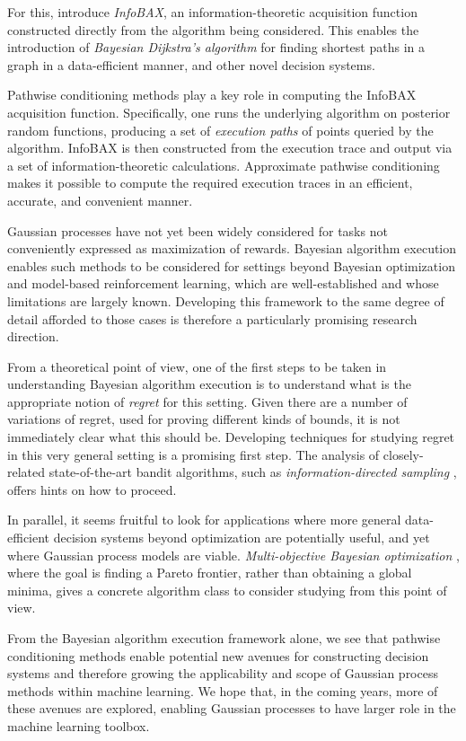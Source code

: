 \documentclass[11pt]{book}
\begin{document}
For this, \textcite{neiswanger21} introduce \emph{InfoBAX}, an information-theoretic acquisition function constructed directly from the algorithm being considered.
This enables the introduction of \emph{Bayesian Dijkstra's algorithm} for finding shortest paths in a graph in a data-efficient manner, and other novel decision systems.

Pathwise conditioning methods play a key role in computing the InfoBAX acquisition function.
Specifically, one runs the underlying algorithm on posterior random functions, producing a set of \emph{execution paths} of points queried by the algorithm.
InfoBAX is then constructed from the execution trace and output via a set of information-theoretic calculations.
Approximate pathwise conditioning makes it possible to compute the required execution traces in an efficient, accurate, and convenient manner.

Gaussian processes have not yet been widely considered for tasks not conveniently expressed as maximization of rewards.
Bayesian algorithm execution enables such methods to be considered for settings beyond Bayesian optimization and model-based reinforcement learning, which are well-established and whose limitations are largely known.
Developing this framework to the same degree of detail afforded to those cases is therefore a particularly promising research direction.

From a theoretical point of view, one of the first steps to be taken in understanding Bayesian algorithm execution is to understand what is the appropriate notion of \emph{regret} for this setting.
Given there are a number of variations of regret, used for proving different kinds of bounds, it is not immediately clear what this should be.
Developing techniques for studying regret in this very general setting is a promising first step.
The analysis of closely-related state-of-the-art bandit algorithms, such as \emph{information-directed sampling} \cite{russo14}, offers hints on how to proceed.

In parallel, it seems fruitful to look for applications where more general data-efficient decision systems beyond optimization are potentially useful, and yet where Gaussian process models are viable. 
\emph{Multi-objective Bayesian optimization} \cite{emmerich05,campigotto14,hernandezlobato16,suzuki20}, where the goal is finding a Pareto frontier, rather than obtaining a global minima, gives a concrete algorithm class to consider studying from this point of view.

From the Bayesian algorithm execution framework alone, we see that pathwise conditioning methods enable potential new avenues for constructing decision systems and therefore growing the applicability and scope of Gaussian process methods within machine learning.
We hope that, in the coming years, more of these avenues are explored, enabling Gaussian processes to have larger role in the machine learning toolbox.
\end{document}

